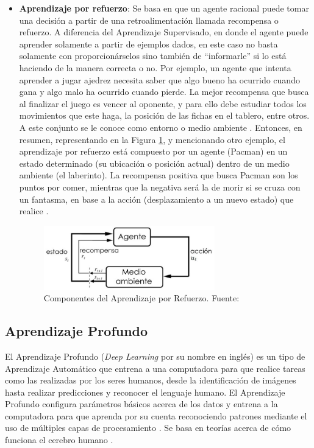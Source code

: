 \begin{itemize}
	\item \textbf{Aprendizaje por refuerzo}: Se basa en que un agente racional puede tomar una decisión a partir de una retroalimentación llamada recompensa o refuerzo. A diferencia del Aprendizaje Supervisado, en donde el agente puede aprender solamente a partir de ejemplos dados, en este caso no basta solamente con proporcionárselos sino también de “informarle” si lo está haciendo de la manera correcta o no. Por ejemplo, un agente que intenta aprender a jugar ajedrez necesita saber que algo bueno ha ocurrido cuando gana y algo malo ha ocurrido cuando pierde. La mejor recompensa que busca al finalizar el juego es vencer al oponente, y para ello debe estudiar todos los movimientos que este haga, la posición de las fichas en el tablero, entre otros. A este conjunto se le conoce como entorno o medio ambiente \parencite{bk_russell2004intart}. Entonces, en resumen, representando en la Figura \ref{2:fig5}, y mencionando otro ejemplo, el aprendizaje por refuerzo está compuesto por un agente (Pacman) en un estado determinado (su ubicación o posición actual) dentro de un medio ambiente (el laberinto). La recompensa positiva que busca Pacman son los puntos por comer, mientras que la negativa será la de morir si se cruza con un fantasma, en base a la acción (desplazamiento a un nuevo estado) que realice \parencite{tec_merino2019aprendrefuerzo}.
	\begin{figure}[h]
		\begin{center}
			\includegraphics[width=0.7\textwidth]{2/figures/aprendizaje_refuerzo.jpg}
			\caption{Componentes del Aprendizaje por Refuerzo. Fuente: \cite{bk_sutton2018rl}}
			\label{2:fig5}
		\end{center}
	\end{figure}
\end{itemize}

\subsection{Aprendizaje Profundo}

El Aprendizaje Profundo (\textit{Deep Learning} por su nombre en inglés) es un tipo de Aprendizaje Automático que entrena a una computadora para que realice tareas como las realizadas por los seres humanos, desde la identificación de imágenes hasta realizar predicciones y reconocer el lenguaje humano. El Aprendizaje Profundo configura parámetros básicos acerca de los datos y entrena a la computadora para que aprenda por su cuenta reconociendo patrones mediante el uso de múltiples capas de procesamiento \parencite{gl_sas_deeplearning}. Se basa en teorías acerca de cómo funciona el cerebro humano \parencite{tec_banafa2019deeplearning}.

